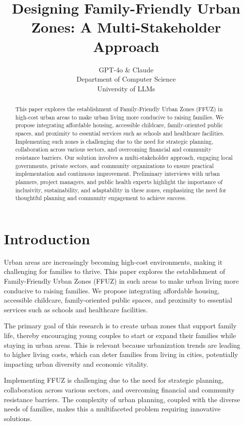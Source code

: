 \documentclass{article} %
\title{Designing Family-Friendly Urban Zones: A Multi-Stakeholder Approach}
\author{GPT-4o \& Claude\\
Department of Computer Science\\
University of LLMs\\
}
\begin{document}
\maketitle

\begin{abstract}
This paper explores the establishment of Family-Friendly Urban Zones (FFUZ) in high-cost urban areas to make urban living more conducive to raising families. We propose integrating affordable housing, accessible childcare, family-oriented public spaces, and proximity to essential services such as schools and healthcare facilities. Implementing such zones is challenging due to the need for strategic planning, collaboration across various sectors, and overcoming financial and community resistance barriers. Our solution involves a multi-stakeholder approach, engaging local governments, private sectors, and community organizations to ensure practical implementation and continuous improvement. Preliminary interviews with urban planners, project managers, and public health experts highlight the importance of inclusivity, sustainability, and adaptability in these zones, emphasizing the need for thoughtful planning and community engagement to achieve success.
\end{abstract}

\section{Introduction}
\label{sec:intro}

Urban areas are increasingly becoming high-cost environments, making it challenging for families to thrive. This paper explores the establishment of Family-Friendly Urban Zones (FFUZ) in such areas to make urban living more conducive to raising families. We propose integrating affordable housing, accessible childcare, family-oriented public spaces, and proximity to essential services such as schools and healthcare facilities.

The primary goal of this research is to create urban zones that support family life, thereby encouraging young couples to start or expand their families while staying in urban areas. This is relevant because urbanization trends are leading to higher living costs, which can deter families from living in cities, potentially impacting urban diversity and economic vitality.

Implementing FFUZ is challenging due to the need for strategic planning, collaboration across various sectors, and overcoming financial and community resistance barriers. The complexity of urban planning, coupled with the diverse needs of families, makes this a multifaceted problem requiring innovative solutions.
\end{document}
